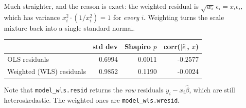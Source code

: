 \documentclass[11pt, letterpaper]{article}
\begin{document}
Much straighter, and the reason is exact: the weighted residual is
$\sqrt{w_i}\, \epsilon_i = x_i \epsilon_i$, which has variance $x_i^2 \cdot (1/x_i^2) = 1$ for
\textit{every} $i$. Weighting turns the scale mixture back into a single standard normal.

\begin{center}
\begin{tabular}{lrrr}
\toprule
 & std dev & Shapiro $p$ & corr($|\hat{\epsilon}|$, $x$) \\
\midrule
OLS residuals            & 0.6994 & 0.0011 & -0.2577 \\
Weighted (WLS) residuals & 0.9852 & 0.1190 & -0.0024 \\
\bottomrule
\end{tabular}
\end{center}

Note that \texttt{model\_wls.resid} returns the \textit{raw} residuals $y_i - x_i \hat{\beta}$, which
are still heteroskedastic. The weighted ones are \texttt{model\_wls.wresid}.
\end{document}
